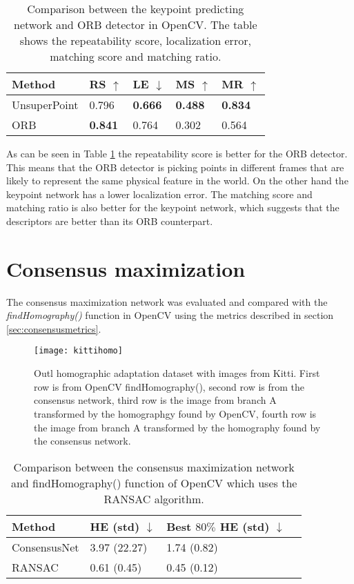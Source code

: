 \begin{table}[H]
\centering
\begin{tabular}{|l|l|l|l|l|}
\hline
Method & RS $\uparrow$ & LE $\downarrow$ & MS $\uparrow$ & MR $\uparrow$ \\
\hline
UnsuperPoint & 0.796 & \textbf{0.666} & \textbf{0.488} & \textbf{0.834} \\
ORB & \textbf{0.841} & 0.764 & 0.302 & 0.564 \\
\hline
\end{tabular}
\caption{Comparison between the keypoint predicting network and ORB detector in OpenCV. The table shows the repeatability score, localization error, matching score and matching ratio.}
\label{table:pointsbenchmark}
\end{table}

As can be seen in Table \ref{table:pointsbenchmark} the repeatability score is better for the ORB detector. This means that the ORB detector is picking points in different frames that are likely to represent the same physical feature in the world. On the other hand the keypoint network has a lower localization error. The matching score and matching ratio is also better for the keypoint network, which suggests that the descriptors are better than its ORB counterpart.

\section{Consensus maximization}
The consensus maximization network was evaluated and compared with the \textit{findHomography()} function in OpenCV using the metrics described in section \ref{sec:consensusmetrics}.

\begin{figure}[H]
	\centering
	\texttt{[image: kittihomo]}
	\caption{Outl homographic adaptation dataset with images from Kitti. First row is from OpenCV findHomography(), second row is from the consensus network, third row is the image from branch A transformed by the homographgy found by OpenCV, fourth row is the image from branch A transformed by the homography found by the consensus network.}
	\label{fig:kittihomo}
\end{figure}

\begin{table}[H]
	\centering
	\begin{tabular}{|l|l|l|l|}
		\hline
		Method & HE (std) $\downarrow$ & Best $80\%$ HE (std) $\downarrow$ \\
		\hline
		ConsensusNet & 3.97 (22.27) & 1.74 (0.82) \\
		RANSAC & 0.61 (0.45) & 0.45 (0.12) \\
		\hline
	\end{tabular}
	\caption{Comparison between the consensus maximization network and findHomography() function of OpenCV which uses the RANSAC algorithm.}
	\label{table:consensusbenchmark}
\end{table}

